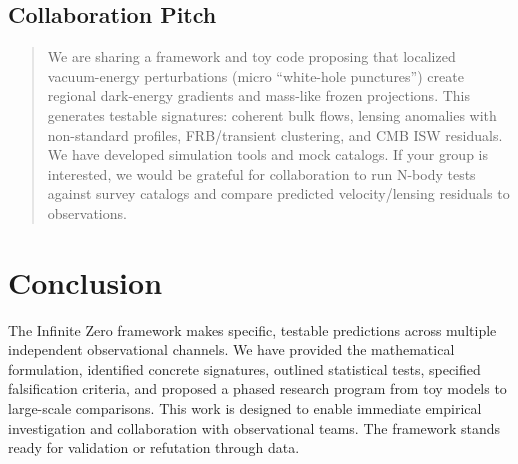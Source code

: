 \documentclass[11pt,a4paper]{article}
\begin{document}
\subsection{Collaboration Pitch}

\begin{quote}
We are sharing a framework and toy code proposing that localized vacuum-energy perturbations (micro ``white-hole punctures'') create regional dark-energy gradients and mass-like frozen projections. This generates testable signatures: coherent bulk flows, lensing anomalies with non-standard profiles, FRB/transient clustering, and CMB ISW residuals. We have developed simulation tools and mock catalogs. If your group is interested, we would be grateful for collaboration to run N-body tests against survey catalogs and compare predicted velocity/lensing residuals to observations.
\end{quote}

\section{Conclusion}

The Infinite Zero framework makes specific, testable predictions across multiple independent observational channels. We have provided the mathematical formulation, identified concrete signatures, outlined statistical tests, specified falsification criteria, and proposed a phased research program from toy models to large-scale comparisons. This work is designed to enable immediate empirical investigation and collaboration with observational teams. The framework stands ready for validation or refutation through data.


\end{document}
